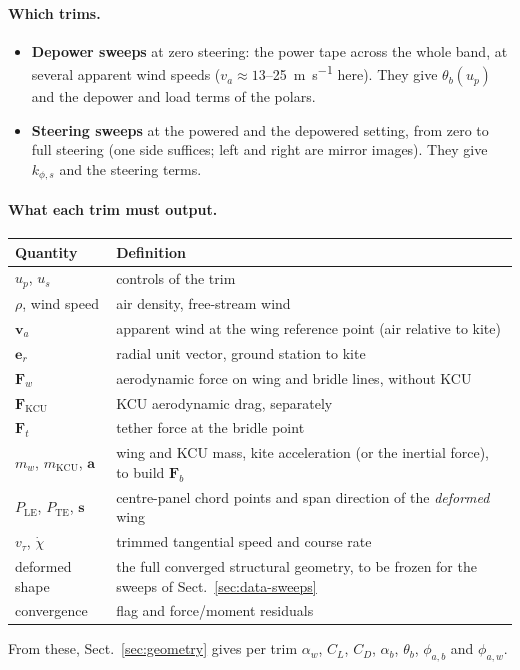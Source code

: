 \documentclass[11pt,a4paper]{article}
\begin{document}
\paragraph{Which trims.}
\begin{itemize}
  \item \textbf{Depower sweeps} at zero steering: the power tape across the
        whole band, at several apparent wind speeds
        ($v_a\approx13$--\SI{25}{\metre\per\second} here). They give
        $\theta_b(u_p)$ and the depower and load terms of the polars.
  \item \textbf{Steering sweeps} at the powered and the depowered setting,
        from zero to full steering (one side suffices; left and right are
        mirror images). They give $k_{\phi,s}$ and the steering terms.
\end{itemize}

\paragraph{What each trim must output.}
\begin{center}
\small
\begin{tabular}{lp{}}
\toprule
Quantity & Definition \\
\midrule
$u_p$, $u_s$ & controls of the trim \\
$\rho$, wind speed & air density, free-stream wind \\
$\mathbf v_a$ & apparent wind at the wing reference point (air relative to kite) \\
$\mathbf e_r$ & radial unit vector, ground station to kite \\
$\mathbf F_w$ & aerodynamic force on wing and bridle lines, without KCU \\
$\mathbf F_\mathrm{KCU}$ & KCU aerodynamic drag, separately \\
$\mathbf F_t$ & tether force at the bridle point \\
$m_w$, $m_\mathrm{KCU}$, $\mathbf a$ & wing and KCU mass, kite acceleration (or the inertial force), to build $\mathbf F_b$ \\
$P_\mathrm{LE}$, $P_\mathrm{TE}$, $\mathbf s$ & centre-panel chord points and span direction of the \emph{deformed} wing \\
$v_\tau$, $\dot\chi$ & trimmed tangential speed and course rate \\
deformed shape & the full converged structural geometry, to be frozen for the sweeps of Sect.~\ref{sec:data-sweeps} \\
convergence & flag and force/moment residuals \\
\bottomrule
\end{tabular}
\end{center}
From these, Sect.~\ref{sec:geometry} gives per trim $\alpha_w$, $C_L$,
$C_D$, $\alpha_b$, $\theta_b$, $\phi_{a,b}$ and $\phi_{a,w}$.
\end{document}

